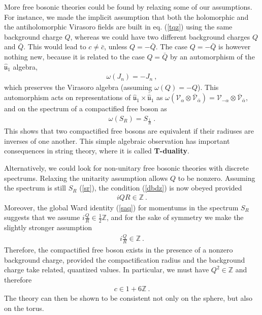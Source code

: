 \documentclass[12pt,a4paper,notitlepage]{report}
\newcommand \Z {\mathbb{Z}}
\numberwithin{equation}{section}
\theoremstyle{break}
\begin{document}
More free bosonic theories could be found by relaxing some of our assumptions. For instance, we made the implicit assumption that both the holomorphic and the antiholomorphic Virasoro fields are built in eq. (\ref{tqz}) using the same background charge $Q$, whereas we could have two different background charges $Q$ and $\bar{Q}$. This would lead to $c\neq \bar{c}$, unless $Q=- \bar{Q}$. 
The case $Q=-\bar{Q}$ is however nothing new, because it is related to the case $Q=\bar{Q}$ by an automorphism of the $\hat{\mathfrak{u}}_1$ algebra,
\begin{align}
 \omega(J_n) = -J_n \ ,
\end{align}
which preserves the Virasoro algebra (assuming $\omega(Q)=-Q$). This automorphism acts on representations of $\hat{\mathfrak{u}}_1 \times \bar{\hat{\mathfrak{u}}}_1$ as $\omega(\mathcal{V}_\alpha \otimes \bar{\mathcal{V}}_{\bar{\alpha}}) =  \mathcal{V}_{-\alpha} \otimes \bar{\mathcal{V}}_{\bar{\alpha}}$, and on the spectrum of a compactified free boson as 
\begin{align}
 \omega(S_R) = S_{\frac{1}{R}}\ .
\end{align}
This shows that two compactified free bosons are equivalent if their radiuses are inverses of one another. This simple algebraic observation has important consequences in string theory, where it is called \textbf{\boldmath T-duality}. 

Alternatively, we could look for non-unitary free bosonic theories with discrete spectrums. Relaxing the unitarity assumption allows $Q$ to be nonzero. Assuming the spectrum is still $S_R$ (\ref{sr}), the condition (\ref{dbdz}) is now obeyed provided 
\begin{align}
 iQR\in \Z \ .
\end{align}
Moreover, the global Ward identity (\ref{saq}) for momentums in the spectrum $S_R$ suggests that we assume $i\frac{Q}{R}\in \frac12 \Z$, and for the sake of symmetry we make the slightly stronger assumption
\begin{align}
 i\frac{Q}{R}\in \Z \ .
\end{align}
Therefore, the compactified free boson exists in the presence of a nonzero background charge, provided the compactification radius 
and the background charge take related, quantized values. In particular, we must have $Q^2\in \Z$ and therefore 
\begin{align}
 c\in 1+6\Z\ .
\end{align}
The theory can then be shown to be consistent not only on the sphere, but also on the torus.
\end{document}
